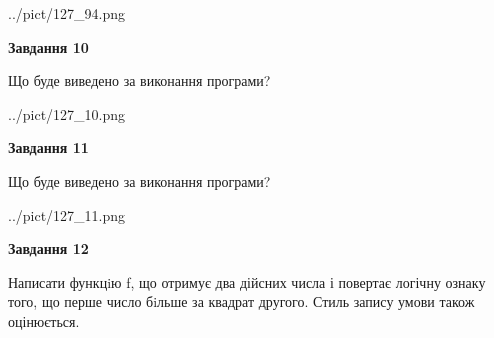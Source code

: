 \documentclass[12pt, ukrainian]{article}
\begin{document}
{\begin {large}
\begin{center}
	{../pict/127_94.png}
\end{center}
\newpage

{\begin {center}\textbf{Завдання 10}\end {center}}

Що буде виведено за виконання програми?\par
\begin{center}
	{../pict/127_10.png}
\end{center}
\newpage

{\begin {center}\textbf{Завдання 11}\end {center}}

Що буде виведено за виконання програми?\par
\begin{center}
	{../pict/127_11.png}
\end{center}
\newpage

{\begin {center}\textbf{Завдання 12}\end {center}}


Написати функцiю f, що отримує два дійсних числа і повертає логічну ознаку того, що перше число бiльше за квадрат другого. Стиль запису умови також оцінюється.\par
\newpage

\end {large}}
\end{document}
